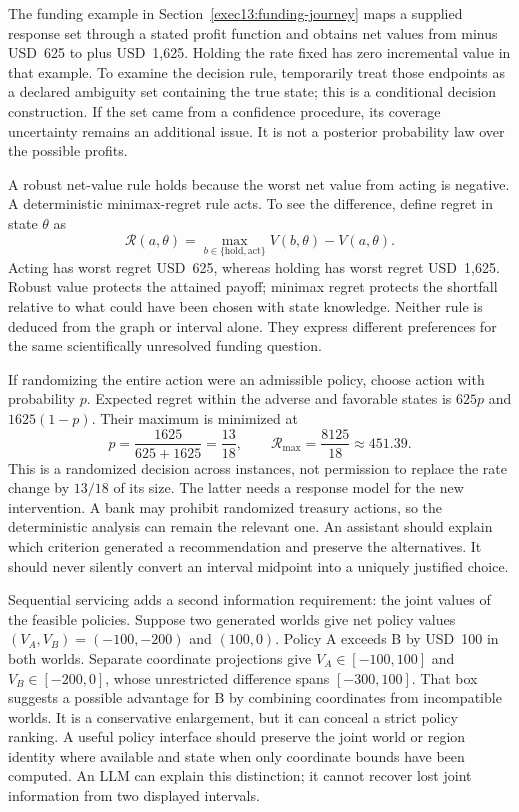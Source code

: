 The funding example in Section~\ref{exec13:funding-journey} maps a supplied
response set through a stated profit function and obtains net values from
minus USD~625 to plus USD~1,625. Holding the rate fixed has zero incremental
value in that example. To examine the decision rule, temporarily treat those
endpoints as a declared ambiguity set containing the true state; this is a
conditional decision construction. If the set came from a confidence procedure,
its coverage uncertainty remains an additional issue. It is not a posterior
probability law over the possible profits.

A robust net-value rule holds because the worst net value from acting is
negative. A deterministic minimax-regret rule acts. To see the difference,
define regret in state $\theta$ as
\[
 \mathcal R(a,\theta)=\max_{b\in\{\mathrm{hold},\mathrm{act}\}}
          V(b,\theta)-V(a,\theta).
\]
Acting has worst regret USD~625, whereas holding has worst regret USD~1,625.
Robust value protects the attained payoff; minimax regret protects the shortfall
relative to what could have been chosen with state knowledge. Neither rule is
deduced from the graph or interval alone. They express different preferences
for the same scientifically unresolved funding question.

If randomizing the entire action were an admissible policy, choose action with
probability $p$. Expected regret within the adverse and favorable states is
$625p$ and $1625(1-p)$. Their maximum is minimized at
\[
 p=\frac{1625}{625+1625}=\frac{13}{18},
 \qquad \mathcal R_{\max}=\frac{8125}{18}\approx451.39.
\]
This is a randomized decision across instances, not permission to replace the
rate change by $13/18$ of its size. The latter needs a response model for the
new intervention. A bank may prohibit randomized treasury actions, so the
deterministic analysis can remain the relevant one. An assistant should explain
which criterion generated a recommendation and preserve the alternatives.
It should never silently convert an interval midpoint into a uniquely justified
choice. \citep{exec14_l8_economics,exec13_funding_exact}

Sequential servicing adds a second information requirement: the joint values
of the feasible policies. Suppose two generated worlds give net policy values
$(V_A,V_B)=(-100,-200)$ and $(100,0)$. Policy A exceeds B by USD~100 in both
worlds. Separate coordinate projections give $V_A\in[-100,100]$ and
$V_B\in[-200,0]$, whose unrestricted difference spans $[-300,100]$. That
box suggests a possible advantage for B by combining coordinates from
incompatible worlds. It is a conservative enlargement, but it can conceal a
strict policy ranking. A useful policy interface should preserve the joint
world or region identity where available and state when only coordinate
bounds have been computed. An LLM can explain this distinction; it cannot
recover lost joint information from two displayed intervals.
\citep{exec14_l8_economics}

